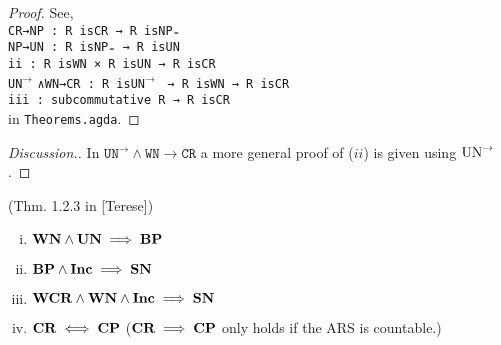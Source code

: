 \begin{proof}
    See, \\
    \verb|CR→NP : R isCR → R isNP₌|\\
    \verb|NP→UN : R isNP₌ → R isUN|\\
    \verb|ii : R isWN × R isUN → R isCR|\\
    \verb||\texttt{UN}$^{\to}$ \verb|∧WN→CR : R |\texttt{isUN}$^{\to}$ \verb| → R isWN → R isCR|\\
    \verb|iii : subcommutative R → R isCR|\\
    in \texttt{Theorems.agda}.
\end{proof}
\begin{proof}[Discussion.]
    In $\mathtt{UN^{→}∧WN→CR}$ a more general proof of ($ii$) is given using $\mathrm{UN}^{\to}$.
\end{proof}

\begin{theorem}(Thm. 1.2.3 in [Terese])
  \begin{enumerate}[(i)]
    \item $\mathbf{WN} \land \mathbf{UN} \implies \mathbf{BP}$
    \item $\mathbf{BP} \land \mathbf{Inc} \implies \mathbf{SN}$
    \item $\mathbf{WCR} \land \mathbf{WN} \land \mathbf{Inc} \implies \mathbf{SN}$
    \item $\mathbf{CR} \iff \mathbf{CP}$ ($\mathbf{CR} \implies \mathbf{CP}$ only holds if the ARS is countable.)
  \end{enumerate}
\end{theorem}

